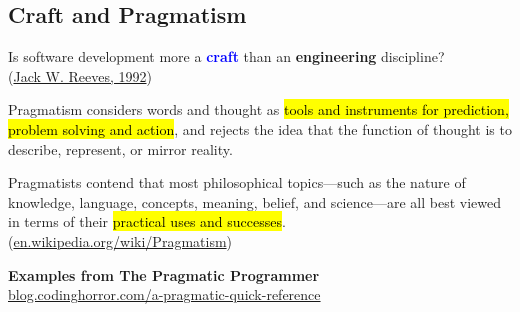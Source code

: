 \subsection{Craft and Pragmatism}
Is software development more a \textcolor{blue}{\bfseries craft} than an \textcolor{OliveGreen}{\bfseries engineering} discipline?\\
(\href{http://www.developerdotstar.com/mag/articles/reeves_design.html}
{Jack W. Reeves, 1992})

Pragmatism considers words and thought as \hl{tools and instruments for prediction,
problem solving and action}, and rejects the idea that the function of thought is to
describe, represent, or mirror reality.

Pragmatists contend that most philosophical
topics—such as the nature of knowledge, language, concepts, meaning, belief, and
science—are all best viewed in terms of their \hl{practical uses and successes}.
(\href{https://en.wikipedia.org/wiki/Pragmatism}{en.wikipedia.org/wiki/Pragmatism})

\newslide
{\bfseries Examples from The Pragmatic Programmer}\\
\href{https://blog.codinghorror.com/a-pragmatic-quick-reference}{blog.codinghorror.com/a-pragmatic-quick-reference}

